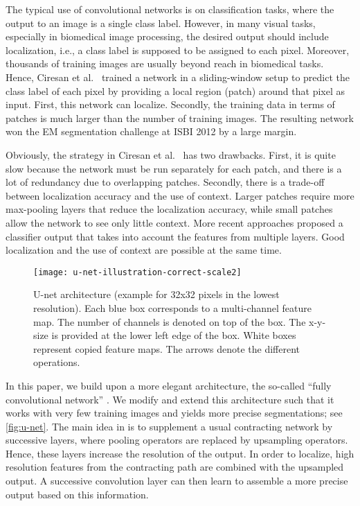 \documentclass{llncs}
\begin{document}
The typical use of convolutional networks is on classification tasks, where the output to an image is a single class label. However, in many visual tasks, especially in biomedical image processing, the desired output should include localization, i.e., a class label is supposed to be assigned to each pixel. Moreover, thousands of training images are usually beyond reach in biomedical tasks. Hence, Ciresan et al.~\cite{schmidhuber12deepneural} trained a network in a sliding-window setup to predict the class label of each pixel by providing a local region (patch) around that pixel as input. First, this network can localize. Secondly, the training data in terms of patches is much larger than the number of training images. The resulting network won the EM segmentation challenge at ISBI 2012 by a large margin.

Obviously, the strategy in Ciresan et al.~\cite{schmidhuber12deepneural} has two drawbacks. First, it is quite slow because the network must be run separately for each patch, and there is a lot of redundancy due to overlapping patches.
Secondly, there is a trade-off between localization accuracy and the use of context. Larger patches require more max-pooling layers that reduce the localization accuracy, while small patches allow the network to see only little context. More recent approaches \cite{Seyedhosseini2013,hypercolumns} proposed a classifier output that takes into account the features from multiple layers. Good localization and the use of context are possible at the same time.

\begin{figure}[t]
  \centering
  \texttt{[image: u-net-illustration-correct-scale2]}
  \caption{U-net architecture (example for 32x32 pixels in the lowest resolution). Each blue box corresponds to a multi-channel feature map. The number of channels is denoted on top of the box. The x-y-size is provided at the lower left edge of the box. White boxes represent copied feature maps. The arrows denote the different operations. 
  }
  \label{fig:u-net}
\end{figure}

In this paper, we build upon a more elegant architecture, the so-called ``fully convolutional network'' \cite{fullyconv}. We modify and extend this architecture such that it works with very few training images and yields more precise segmentations; see \autoref{fig:u-net}. The main idea in \cite{fullyconv} is to supplement a usual contracting network by successive layers, where pooling operators are replaced by upsampling operators. Hence, these layers increase the resolution of the output. In order to localize, high resolution features from the contracting path are combined with the upsampled output. A successive convolution layer can then learn to assemble a more precise output based on this information.
\end{document}
